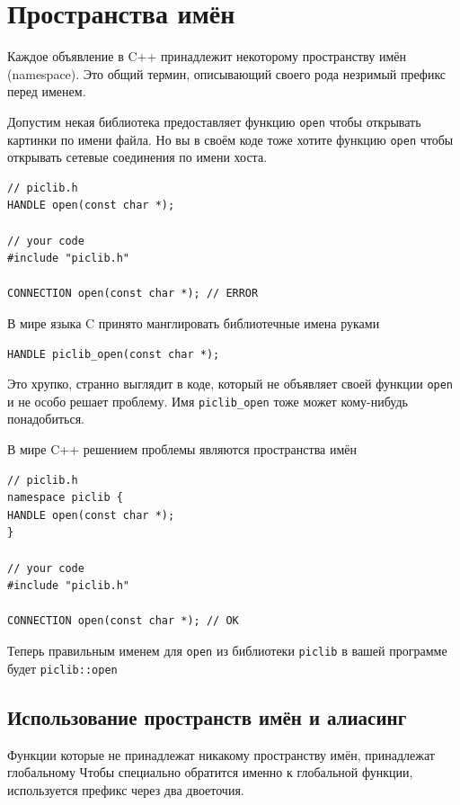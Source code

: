 \documentclass[a4paper,12pt,oneside]{book}
\begin{document}
\pagebreak
\section{Пространства имён}\label{Namespaces}

Каждое объявление в C++ принадлежит некоторому пространству имён (namespace). Это общий термин, описывающий своего рода незримый префикс перед именем. 

Допустим некая библиотека предоставляет функцию \lstinline!open! чтобы открывать картинки по имени файла. Но вы в своём коде тоже хотите функцию \lstinline!open! чтобы открывать сетевые соединения по имени хоста.

\begin{lstlisting}
// piclib.h
HANDLE open(const char *);

// your code
#include "piclib.h"

CONNECTION open(const char *); // ERROR
\end{lstlisting}

В мире языка C принято манглировать библиотечные имена руками

\begin{lstlisting}
HANDLE piclib_open(const char *);
\end{lstlisting}

Это хрупко, странно выглядит в коде, который не объявляет своей функции \lstinline!open! и не особо решает проблему. Имя \lstinline!piclib_open! тоже может кому-нибудь понадобиться.

В мире C++ решением проблемы являются пространства имён

\begin{lstlisting}
// piclib.h
namespace piclib {
HANDLE open(const char *);
}

// your code
#include "piclib.h"

CONNECTION open(const char *); // OK
\end{lstlisting}

Теперь правильным именем для \lstinline!open! из библиотеки \lstinline!piclib! в вашей программе будет \lstinline!piclib::open!

\subsection{Использование пространств имён и алиасинг}

Функции которые не принадлежат никакому пространству имён, принадлежат глобальному
Чтобы специально обратится именно к глобальной функции, используется префикс через два двоеточия.
\end{document}
